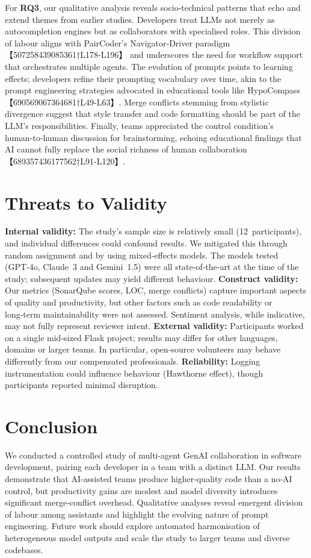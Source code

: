 \documentclass[conference]{IEEEtran}
\begin{document}
For \textbf{RQ3}, our qualitative analysis reveals socio‑technical patterns that echo and extend themes from earlier studies.  Developers treat LLMs not merely as autocompletion engines but as collaborators with specialised roles.  This division of labour aligns with PairCoder’s Navigator‑Driver paradigm 【507258439085361†L178-L196】 and underscores the need for workflow support that orchestrates multiple agents.  The evolution of prompts points to learning effects; developers refine their prompting vocabulary over time, akin to the prompt engineering strategies advocated in educational tools like HypoCompass 【690569067364681†L49-L63】.  Merge conflicts stemming from stylistic divergence suggest that style transfer and code formatting should be part of the LLM’s responsibilities.  Finally, teams appreciated the control condition’s human‑to‑human discussion for brainstorming, echoing educational findings that AI cannot fully replace the social richness of human collaboration 【689357436177562†L91-L120】.

\section{Threats to Validity}
\textbf{Internal validity:} The study’s sample size is relatively small (12 participants), and individual differences could confound results.  We mitigated this through random assignment and by using mixed‑effects models.  The models tested (GPT‑4o, Claude 3 and Gemini 1.5) were all state‑of‑the‑art at the time of the study; subsequent updates may yield different behaviour.  \textbf{Construct validity:} Our metrics (SonarQube scores, LOC, merge conflicts) capture important aspects of quality and productivity, but other factors such as code readability or long‑term maintainability were not assessed.  Sentiment analysis, while indicative, may not fully represent reviewer intent.  \textbf{External validity:} Participants worked on a single mid‑sized Flask project; results may differ for other languages, domains or larger teams.  In particular, open‑source volunteers may behave differently from our compensated professionals.  \textbf{Reliability:} Logging instrumentation could influence behaviour (Hawthorne effect), though participants reported minimal disruption.

\section{Conclusion}
We conducted a controlled study of multi‑agent GenAI collaboration in software development, pairing each developer in a team with a distinct LLM.  Our results demonstrate that AI‑assisted teams produce higher‑quality code than a no‑AI control, but productivity gains are modest and model diversity introduces significant merge‑conflict overhead.  Qualitative analyses reveal emergent division of labour among assistants and highlight the evolving nature of prompt engineering.  Future work should explore automated harmonisation of heterogeneous model outputs and scale the study to larger teams and diverse codebases.
\end{document}

